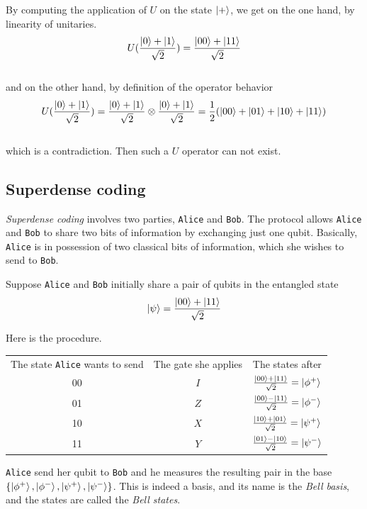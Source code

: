 \documentclass{article}
\begin{document}
By computing the application of $U$ on the state $\ket{+}$, we get on the one hand, by linearity of
unitaries.
\begin{equation}
    U(\frac{\ket{0}+\ket{1}}{\sqrt{2}}) = \frac{\ket{00}+\ket{11}}{\sqrt{2}}
\end{equation}
\\
and on the other hand, by definition of the operator behavior
\begin{equation}
    U(\frac{\ket{0}+\ket{1}}{\sqrt{2}}) = \frac{\ket{0}+\ket{1}}{\sqrt{2}}
    \otimes \frac{\ket{0}+\ket{1}}{\sqrt{2}}
    =\frac{1}{2}(\ket{00}+\ket{01}+\ket{10}+\ket{11})
\end{equation}
\\
which is a contradiction. Then such a $U$ operator can not exist.

\subsection{Superdense coding}
\textit{Superdense coding} involves two parties, \texttt{Alice} and \texttt{Bob}.
The protocol allows \texttt{Alice} and \texttt{Bob} to share two bits of information by
exchanging just one qubit.
Basically, \texttt{Alice} is in possession of two classical bits of information, which she
wishes to send to \texttt{Bob}.

Suppose \texttt{Alice} and \texttt{Bob} initially share a pair of qubits in the entangled state
\begin{equation}
    \ket{\psi} = \frac{\ket{00} + \ket{11}}{\sqrt{2}}
\end{equation}

Here is the procedure.

\begin{table}[h]
    \centering
    \begin{tabular}{c|c|c}
    The state \texttt{Alice} wants to send & The gate she applies & The states after \\
    00 & $I$ & $\frac{\ket{00} + \ket{11}}{\sqrt{2}} = \ket{\phi^+}$  \\
    01 & $Z$ & $\frac{\ket{00} - \ket{11}}{\sqrt{2}} = \ket{\phi^-}$ \\
    10 & $X$ & $\frac{\ket{10} + \ket{01}}{\sqrt{2}} = \ket{\psi^+}$ \\
    11 & $Y$ & $\frac{\ket{01} - \ket{10}}{\sqrt{2}} = \ket{\psi^-}$
    \end{tabular}
\end{table}

\texttt{Alice} send her qubit to \texttt{Bob} and he measures the resulting pair in the base \\
$\{\ket{\phi^+}, \ket{\phi^-},\ket{\psi^+}, \ket{\psi^-}\}$. This is indeed a basis, and
its name is the \textit{Bell basis},
and the states are called the \textit{Bell states}.
\end{document}
